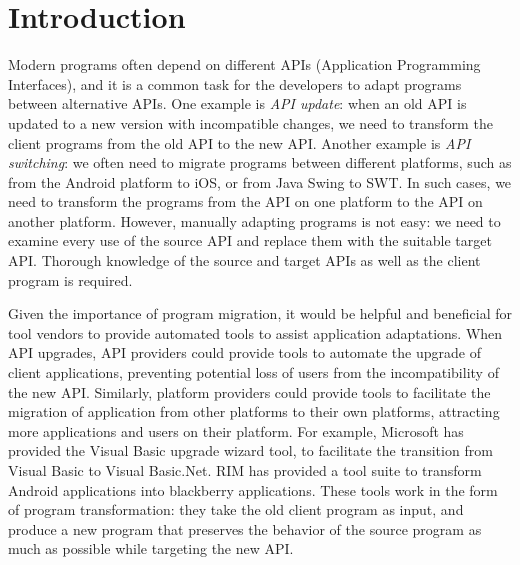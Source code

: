\section{Introduction}
\label{intro}


Modern programs often depend on different APIs (Application
Programming Interfaces), and it is a common task for the developers to
adapt programs between alternative APIs. One example is \emph{API update}: when an old API
is updated to a new version with incompatible changes, we need to
transform the client programs from the old API to the new API. Another
example is \emph{API switching}: we often need to migrate programs between different
platforms, such as from the Android platform to iOS, or from Java
Swing to SWT. In such cases, we need to transform the programs from the
API on one platform to the API on another platform. However, manually
adapting programs is not easy: we need to examine every use of the
source API and replace them with the suitable target API. Thorough
knowledge of the source and target APIs as well as the client program
is required.

Given the importance of program migration, it would be helpful and
beneficial for tool vendors to provide automated tools to assist
application adaptations. When API upgrades, API providers could
provide tools to automate the upgrade of client applications,
preventing potential loss of users from the incompatibility of the new
API. Similarly, platform providers could provide tools to facilitate
the migration of application from other platforms to their own
platforms, attracting more applications and users on their platform.
For example, Microsoft has provided the Visual Basic upgrade wizard
tool, to facilitate the transition from Visual Basic to Visual
Basic.Net. RIM has provided a tool suite to transform Android
applications into blackberry applications. These tools work in the
form of program transformation: they take the old client program as
input, and produce a new program that preserves the behavior of the
source program as much as possible while targeting the new API.

